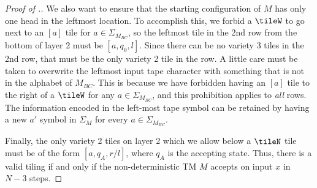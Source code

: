 \begin{proof}[Proof of .]
We also want to ensure that the starting configuration of $M$ has
only one head in the leftmost location.  To accomplish this,
we forbid a $\tileW$ to go next to an $[a]$ tile for $a \in \Sigma_{M_{BC}}$, so
the leftmost tile in the 2nd row from the bottom of layer 2 must be $[a,q_0,l]$.  Since there
can be no variety 3 tiles in the 2nd row, that must be the only variety 2 tile
in the row.  A little care must be taken to overwrite the leftmost input tape
character with something that is not in the alphabet of $M_{BC}$.
This is because we have forbidden having an $[a]$ tile to the right
of a $\tileW$ for any $a \in \Sigma_{M_{BC}}$, and this prohibition
applies to \emph{all} rows.
The information encoded in the left-most tape symbol can be retained by
having a new $a'$ symbol in $\Sigma_M$ for every $a \in \Sigma_{M_{BC}}$.

Finally, the only variety 2 tiles on layer 2 which we allow below a
$\tileN$ tile must be of the form $[a,q_A, r/l]$, where $q_A$ is the accepting state.
Thus, there is a valid tiling if and only if the non-deterministic TM $M$ accepts on input $x$ in $N-3$ steps.
\end{proof}

